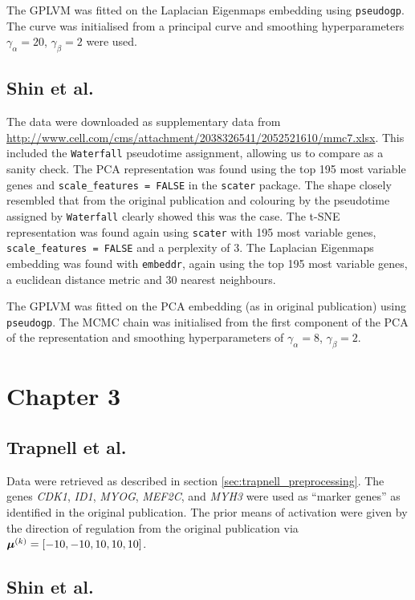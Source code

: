 The GPLVM was fitted on the Laplacian Eigenmaps embedding using \texttt{pseudogp}. The curve was initialised from a principal curve and smoothing hyperparameters $\gamma_\alpha = 20$, $\gamma_\beta = 2$ were used.

\subsection{Shin et al.} \label{sec:shin_preprocessing}
The data were downloaded as supplementary data from \url{http://www.cell.com/cms/attachment/2038326541/2052521610/mmc7.xlsx}. This included the \texttt{Waterfall} pseudotime assignment, allowing us to compare as a sanity check. The PCA representation was found using the top 195 most variable genes and \texttt{scale\_features = FALSE} in the \texttt{scater} package. The shape closely resembled that from the original publication and colouring by the pseudotime assigned by \texttt{Waterfall} clearly showed this was the case. The t-SNE representation was found again using \texttt{scater} with 195 most variable genes, \texttt{scale\_features = FALSE} and a perplexity of 3. The Laplacian Eigenmaps embedding was found with \texttt{embeddr}, again using the top 195 most variable genes, a euclidean distance metric and 30 nearest neighbours.

The GPLVM was fitted on the PCA embedding (as in original publication) using \texttt{pseudogp}. The MCMC chain was initialised from the first component of the PCA of the representation and smoothing hyperparameters of $\gamma_\alpha = 8$, $\gamma_\beta = 2$.


\section{Chapter 3}

\subsection{Trapnell et al.}

Data were retrieved as described in section \ref{sec:trapnell_preprocessing}. The genes \emph{CDK1}, \emph{ID1}, \emph{MYOG}, \emph{MEF2C}, and \emph{MYH3} were used as ``marker genes'' as identified in the original publication. The prior means of activation were given by the direction of regulation from the original publication via $\bm{\mu}^{(k)} = [-10, -10, 10, 10, 10]$.

\subsection{Shin et al.}

